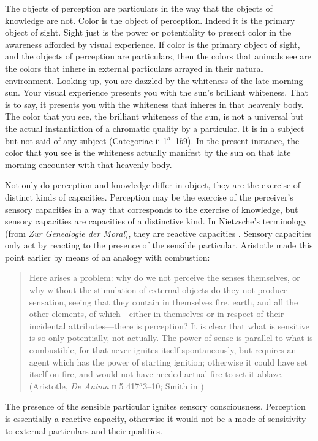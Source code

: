 The objects of perception are particulars in the way that the objects of knowledge are not. Color is the object of perception. Indeed it is the primary object of sight. Sight just is the power or potentiality to present color in the awareness afforded by visual experience. If color is the primary object of sight, and the objects of perception are particulars, then the colors that animals see are the colors that inhere in external particulars arrayed in their natural environment. Looking up, you are dazzled by the whiteness of the late morning sun. Your visual experience presents you with the sun's brilliant whiteness. That is to say, it presents you with the whiteness that inheres in that heavenly body. The color that you see, the brilliant whiteness of the sun, is not a universal but the actual instantiation of a chromatic quality by a particular. It is in a subject but not said of any subject (Categoriae ii 1\( ^{a} \)--1\( b \)9). In the present instance, the color that you see is the whiteness actually manifest by the sun on that late morning encounter with that heavenly body.

Not only do perception and knowledge differ in object, they are the exercise of distinct kinds of capacities. Perception may be the exercise of the perceiver's sensory capacities in a way that corresponds to the exercise of knowledge, but sensory capacities are capacities of a distinctive kind. In Nietzsche's  terminology (from \emph{Zur Genealogie der Moral}), they are reactive capacities \citep[for an illuminating discussion see][]{Deleuze:2006as}. Sensory capacities only act by reacting to the presence of the sensible particular. Aristotle made this point earlier by means of an analogy with combustion:
\begin{quote}
	Here arises a problem: why do we not perceive the senses themselves, or why without the stimulation of external objects do they not produce sensation, seeing that they contain in themselves fire, earth, and all the other elements, of which—either in themselves or in respect of their incidental attributes—there is perception? It is clear that what is sensitive is so only potentially, not actually. The power of sense is parallel to what is combustible, for that never ignites itself spontaneously, but requires an agent which has the power of starting ignition; otherwise it could have set itself on fire, and would not have needed actual fire to set it ablaze. (Aristotle, \emph{De Anima} \textsc{ii} 5 417\( ^{a} \)3--10; Smith in \citealt[29]{Barnes:1984uq})
\end{quote}
The presence of the sensible particular ignites sensory consciousness. Perception is essentially a reactive capacity, otherwise it would not be a mode of sensitivity to external particulars and their qualities.

